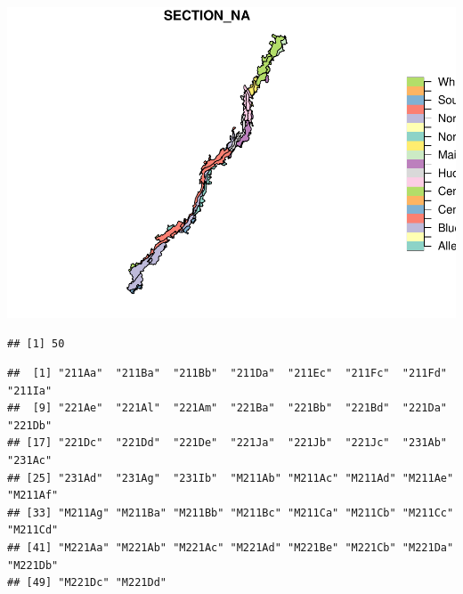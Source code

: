 \documentclass[
]{book}
\newenvironment{Shaded}{\begin{snugshade}}{\end{snugshade}}
\newcommand{\DocumentationTok}[1]{\textcolor[rgb]{0.56,0.35,0.01}{\textbf{\textit{#1}}}}
\newcommand{\FunctionTok}[1]{\textcolor[rgb]{0.13,0.29,0.53}{\textbf{#1}}}
\newcommand{\NormalTok}[1]{#1}
\newcommand{\SpecialCharTok}[1]{\textcolor[rgb]{0.81,0.36,0.00}{\textbf{#1}}}
\begin{document}
\includegraphics{_main_files/figure-latex/eco-subsections-2.pdf}

\begin{Shaded}
\end{Shaded}

\begin{verbatim}
## [1] 50
\end{verbatim}

\begin{Shaded}
\end{Shaded}

\begin{verbatim}
##  [1] "211Aa"  "211Ba"  "211Bb"  "211Da"  "211Ec"  "211Fc"  "211Fd"  "211Ia" 
##  [9] "221Ae"  "221Al"  "221Am"  "221Ba"  "221Bb"  "221Bd"  "221Da"  "221Db" 
## [17] "221Dc"  "221Dd"  "221De"  "221Ja"  "221Jb"  "221Jc"  "231Ab"  "231Ac" 
## [25] "231Ad"  "231Ag"  "231Ib"  "M211Ab" "M211Ac" "M211Ad" "M211Ae" "M211Af"
## [33] "M211Ag" "M211Ba" "M211Bb" "M211Bc" "M211Ca" "M211Cb" "M211Cc" "M211Cd"
## [41] "M221Aa" "M221Ab" "M221Ac" "M221Ad" "M221Be" "M221Cb" "M221Da" "M221Db"
## [49] "M221Dc" "M221Dd"
\end{verbatim}

\begin{Shaded}
\end{Shaded}
\end{document}
